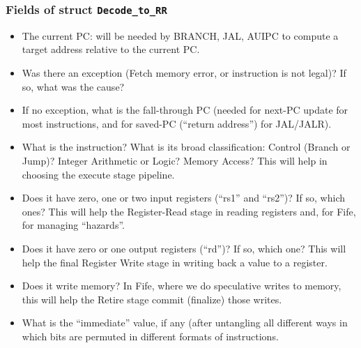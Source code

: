 
\begin{frame}
\frametitle{Fields of struct {\tt Decode\_to\_RR}}

\footnotesize

\begin{itemize}

 \item The current PC: will be needed by BRANCH, JAL, AUIPC to compute
       a target address relative to the current PC.

 \PAUSE{\vspace{1ex}}

 \item Was there an exception (Fetch memory error, or instruction is not legal)?
       If so, what was the cause?

 \PAUSE{\vspace{1ex}}

 \item If no exception, what is the fall-through PC (needed for
       next-PC update for most instructions, and for saved-PC
       (``return address'') for JAL/JALR).

 \PAUSE{\vspace{1ex}}

 \item What is the instruction?  What is its broad classification:
       Control (Branch or Jump)? Integer Arithmetic or Logic? Memory
       Access?  This will help in choosing the execute stage pipeline.

 \PAUSE{\vspace{1ex}}

 \item Does it have zero, one or two input registers (``rs1'' and
       ``rs2'')?  If so, which ones?  This will help the Register-Read
       stage in reading registers and, for Fife, for managing ``hazards''.

 \PAUSE{\vspace{1ex}}

 \item Does it have zero or one output registers (``rd'')?  If so,
       which one?  This will help the final Register Write stage in
       writing back a value to a register.

 \PAUSE{\vspace{1ex}}

 \item Does it write memory?  In Fife, where we do speculative writes
       to memory, this will help the Retire stage commit (finalize)
       those writes.

 \PAUSE{\vspace{1ex}}

 \item What is the ``immediate'' value, if any (after untangling all
       different ways in which bits are permuted in different formats of
       instructions.

\end{itemize}

\end{frame}

